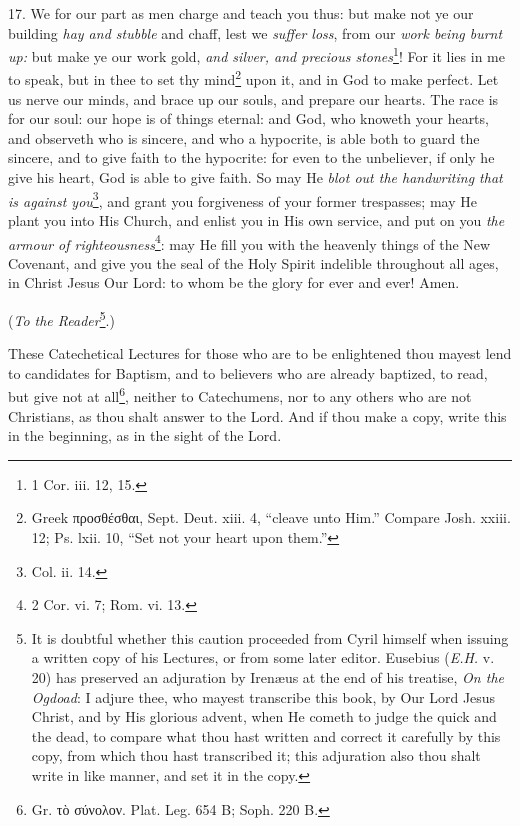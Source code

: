 17. We for our part as men charge and teach you thus: but make not ye our building \emph{hay and stubble} and chaff, lest we \emph{suffer loss}, from our \emph{work being burnt up:} but make ye our work gold, \emph{and silver, and precious stones}\footnote{1 Cor. iii. 12, 15.}! For it lies in me to speak, but in thee to set thy mind\footnote{Greek \textgreek{προσθέσθαι}, Sept. Deut. xiii. 4, “cleave unto Him.” Compare Josh. xxiii. 12; Ps. lxii. 10, “Set not your heart upon them.”} upon it, and in God to make perfect. Let us nerve our minds, and brace up our souls, and prepare our hearts. The race is for our soul: our hope is of things eternal: and God, who knoweth your hearts, and observeth who is sincere, and who a hypocrite, is able both to guard the sincere, and to give faith to the hypocrite: for even to the unbeliever, if only he give his heart, God is able to give faith. So may He \emph{blot out the handwriting that is against you}\footnote{Col. ii. 14.}, and grant you forgiveness of your former trespasses; may He plant you into His Church, and enlist you in His own service, and put on you \emph{the armour of righteousness}\footnote{2 Cor. vi. 7; Rom. vi. 13.}: may He fill you with the heavenly things of the New Covenant, and give you the seal of the Holy Spirit indelible throughout all ages, in Christ Jesus Our Lord: to whom be the glory for ever and ever! Amen.

(\emph{To the Reader}\footnote{It is doubtful whether this caution proceeded from Cyril himself when issuing a written copy of his Lectures, or from some later editor. Eusebius (\emph{E.H.} v. 20) has preserved an adjuration by Irenæus at the end of his treatise, \emph{On the Ogdoad}: I adjure thee, who mayest transcribe this book, by Our Lord Jesus Christ, and by His glorious advent, when He cometh to judge the quick and the dead, to compare what thou hast written and correct it carefully by this copy, from which thou hast transcribed it; this adjuration also thou shalt write in like manner, and set it in the copy.}.)

These Catechetical Lectures for those who are to be enlightened thou mayest lend to candidates for Baptism, and to believers who are already baptized, to read, but give not at all\footnote{Gr. \textgreek{τὸ σύνολον}. Plat. Leg. 654 B; Soph. 220 B.}, neither to Catechumens, nor to any others who are not Christians, as thou shalt answer to the Lord. And if thou make a copy, write this in the beginning, as in the sight of the Lord.


